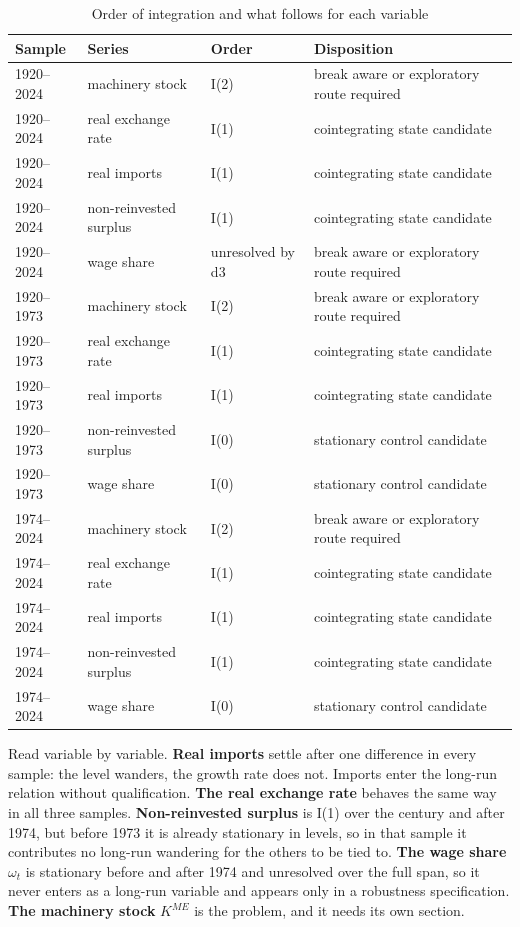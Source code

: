 \documentclass[11pt]{article}
\begin{document}
\begin{table}[H]
\centering
\caption{Order of integration and what follows for each variable}
\begin{tabular}{p{2.1cm}p{3.4cm}p{2.2cm}p{6.0cm}}
\toprule
\textbf{Sample} & \textbf{Series} & \textbf{Order} & \textbf{Disposition} \\
\midrule
1920--2024 & machinery stock & I(2) & break aware or exploratory route required \\
1920--2024 & real exchange rate & I(1) & cointegrating state candidate \\
1920--2024 & real imports & I(1) & cointegrating state candidate \\
1920--2024 & non-reinvested surplus & I(1) & cointegrating state candidate \\
1920--2024 & wage share & unresolved by d3 & break aware or exploratory route required \\
1920--1973 & machinery stock & I(2) & break aware or exploratory route required \\
1920--1973 & real exchange rate & I(1) & cointegrating state candidate \\
1920--1973 & real imports & I(1) & cointegrating state candidate \\
1920--1973 & non-reinvested surplus & I(0) & stationary control candidate \\
1920--1973 & wage share & I(0) & stationary control candidate \\
1974--2024 & machinery stock & I(2) & break aware or exploratory route required \\
1974--2024 & real exchange rate & I(1) & cointegrating state candidate \\
1974--2024 & real imports & I(1) & cointegrating state candidate \\
1974--2024 & non-reinvested surplus & I(1) & cointegrating state candidate \\
1974--2024 & wage share & I(0) & stationary control candidate \\
\bottomrule
\end{tabular}
\end{table}

Read variable by variable. \textbf{Real imports} settle after one difference in every sample: the level wanders, the growth rate does not. Imports enter the long-run relation without qualification. \textbf{The real exchange rate} behaves the same way in all three samples. \textbf{Non-reinvested surplus} is I(1) over the century and after 1974, but before 1973 it is already stationary in levels, so in that sample it contributes no long-run wandering for the others to be tied to. \textbf{The wage share} $\omega_t$ is stationary before and after 1974 and unresolved over the full span, so it never enters as a long-run variable and appears only in a robustness specification. \textbf{The machinery stock} $K^{ME}$ is the problem, and it needs its own section.
\end{document}
